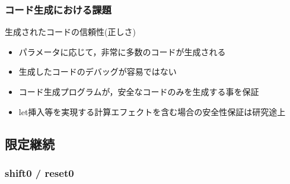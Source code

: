 \documentclass[dvipdfmx,cjk,xcolor=dvipsnames,envcountsect,notheorems,12pt]{beamer}
\theoremstyle{definition}
\begin{document}
\begin{frame}
  \frametitle{コード生成における課題}
  生成されたコードの信頼性(正しさ)
  \begin{itemize}
  \item パラメータに応じて，非常に多数のコードが生成される
  \item 生成したコードのデバッグが容易ではない
  \end{itemize}

  \begin{itemize}
  \item<2-> コード生成プログラムが，安全なコードのみを生成する事を保証
  \item<2-> let挿入等を実現する\alert{計算エフェクトを含む場合の安全性保証は研究途上}
  \end{itemize}
\end{frame}

\subsection{限定継続}

\begin{frame}
  \frametitle{shift0 / reset0}

\end{frame}



\end{document}
